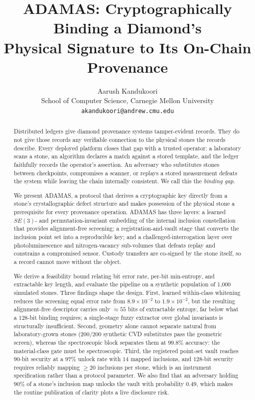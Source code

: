 \documentclass[10pt,twocolumn]{article}
\title{\vspace{-2.2em}\bfseries ADAMAS: Cryptographically Binding a Diamond's\\
Physical Signature to Its On-Chain Provenance}
\author{%
\normalsize Aarush Kandukoori\\[1pt]
\small School of Computer Science, Carnegie Mellon University\\
\small \texttt{akandukoori@andrew.cmu.edu}
}
\date{}
\theoremstyle{remark}
\begin{document}
\maketitle

\begin{abstract}
\noindent
Distributed ledgers give diamond provenance systems tamper-evident records. They
do not give those records any verifiable connection to the physical stones the
records describe. Every deployed platform closes that gap with a trusted
operator: a laboratory scans a stone, an algorithm declares a match against a
stored template, and the ledger faithfully records the operator's assertion. An
adversary who substitutes stones between checkpoints, compromises a scanner, or
replays a stored measurement defeats the system while leaving the chain
internally consistent. We call this the \emph{binding gap}.

We present ADAMAS, a protocol that derives a cryptographic key directly from a
stone's crystallographic defect structure and makes possession of the physical
stone a prerequisite for every provenance operation. ADAMAS has three layers: a
learned $SE(3)$- and permutation-invariant embedding of the internal inclusion
constellation that provides alignment-free screening; a registration-and-vault
stage that converts the inclusion point set into a reproducible key; and a
challenged-interrogation layer over photoluminescence and nitrogen-vacancy
sub-volumes that defeats replay and constrains a compromised sensor. Custody
transfers are co-signed by the stone itself, so a record cannot move without the
object.

We derive a feasibility bound relating bit error rate, per-bit min-entropy, and
extractable key length, and evaluate the pipeline on a synthetic population of
1{,}000 simulated stones. Three findings shape the design. First, learned
within-class whitening reduces the screening equal error rate from
$8.9\times10^{-2}$ to $1.9\times10^{-2}$, but the resulting alignment-free
descriptor carries only $\approx 55$ bits of extractable entropy, far below what
a $128$-bit binding requires; a single-stage fuzzy extractor over global
invariants is structurally insufficient. Second, geometry alone cannot separate
natural from laboratory-grown stones ($200/200$ synthetic CVD substitutes pass
the geometric screen), whereas the spectroscopic block separates them at
$99.8\%$ accuracy: the material-class gate must be spectroscopic. Third, the
registered point-set vault reaches $90$-bit security at a $97\%$ unlock rate
with $14$ mapped inclusions, and $128$-bit security requires reliably mapping
$\geq 20$ inclusions per stone, which is an instrument specification rather than
a protocol parameter. We also find that an adversary holding $90\%$ of a stone's
inclusion map unlocks the vault with probability $0.49$, which makes the routine
publication of clarity plots a live disclosure risk.


\end{abstract}
\end{document}
